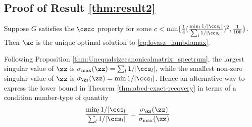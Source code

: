
\subsection{Proof of Result \ref{thm:result2}} 

\begin{theorem} \label{thm:abcd-exact-recovery}
Suppose $G$ satisfies the $\cscc$ property for some $c < \min \{ \frac{1}{4} (\frac{\min_l 1/|\ccs_l|}{\sum_l 1/|\ccs_l|})^2,\frac{1}{100} \}$.  Then $\ac$ is the unique optimal solution to \eqref{eq:lovasz_lambdamax}.
\end{theorem}

Following Proposition \ref{thm:Unequalsizecanonicalmatrix_spectrum}, the largest singular value of $\zz$ is $\sigma_{\max}(\zz) = \sum_l 1/|\ccs_l|$, while the smallest non-zero singular value of $\zz$ is $\sigma_{\ks}(\zz) = \min 1/|\ccs_l|$.  Hence an alternative way to express the lower bound in Theorem \ref{thm:abcd-exact-recovery} in terms of a condition number-type of quantity 
$$\frac{ \min_l 1/|\ccs_l| }{ \sum_l 1/|\ccs_l| }= \frac{ \sigma_{\ks}(\zz) }{ \sigma_{\max}(\zz) }.$$

